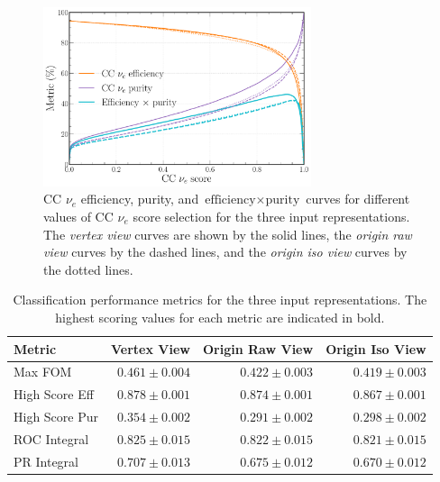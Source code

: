 \begin{figure} %
    \includegraphics[width=0.7\textwidth]{diagrams/7-results/repr_nuel_eff_curves.pdf}
    \caption[CC $\nu_{e}$ efficiency and purity curves for different input representations]
    {CC $\nu_{e}$ efficiency, purity, and $\text{efficiency}\times\text{purity}$ curves for
        different values of CC $\nu_{e}$ score selection for the three input representations. The
        \emph{vertex view} curves are shown by the solid lines, the \emph{origin raw view} curves
        by the dashed lines, and the \emph{origin iso view} curves by the dotted lines.}
    \label{fig:repr_nuel_eff_curves}
\end{figure}

\begin{table} %
    \begin{tabular}{lrrr}
        Metric         & Vertex View    & Origin Raw View & Origin Iso View \\
        \midrule
        Max FOM        & \textbf{$0.461\pm0.004$} & $0.422\pm0.003$ & $0.419\pm0.003$ \\
        High Score Eff & \textbf{$0.878\pm0.001$} & $0.874\pm0.001$ & $0.867\pm0.001$ \\
        High Score Pur & \textbf{$0.354\pm0.002$} & $0.291\pm0.002$ & $0.298\pm0.002$ \\
        ROC Integral   & \textbf{$0.825\pm0.015$} & $0.822\pm0.015$ & $0.821\pm0.015$ \\
        PR Integral    & \textbf{$0.707\pm0.013$} & $0.675\pm0.012$ & $0.670\pm0.012$ \\
    \end{tabular}
    \caption[Classification performance metrics for different input representations]
    {Classification performance metrics for the three input representations. The highest scoring
        values for each metric are indicated in bold.}
    \label{tab:repr}
\end{table}

